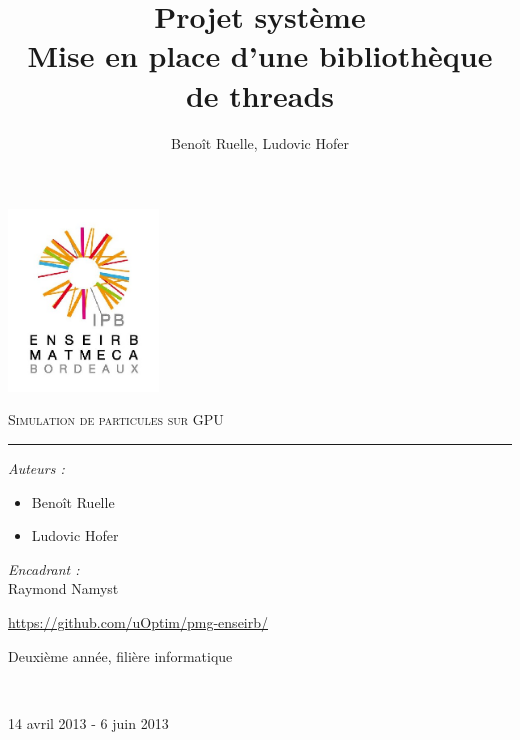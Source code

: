 \documentclass{article}
\title{Projet système \\ Mise en place d'une bibliothèque de threads}
\author{Benoît Ruelle, Ludovic Hofer}
\begin{document}
\begin{center}
  \includegraphics [width=40mm]{ENSEIRB-MATMECA.jpg} 


\textsc{\Huge Simulation de particules sur GPU}\\[0.5cm]
\rule{0.4\textwidth}{1pt}


\begin{center}
  
  \begin{flushleft}
    \large
    \emph{Auteurs :}\\
    \begin{itemize}
    \item Benoît Ruelle
    \item Ludovic Hofer
    \end{itemize}
  \end{flushleft}
  
  
  \begin{flushright}
    \large
    \emph{Encadrant :}\\
    Raymond Namyst
  \end{flushright}
\end{center}


{\large \url{https://github.com/uOptim/pmg-enseirb/}}


{\large Deuxième année, filière informatique}

~

{\large 14 avril 2013 - 6 juin 2013}\\

\end{center}
\thispagestyle{empty}
\pagebreak
\tableofcontents
\newpage
\end{document}
